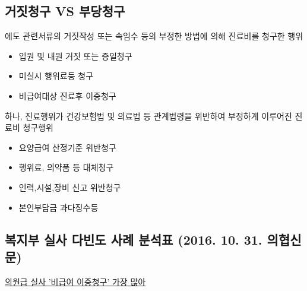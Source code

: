 \subsection{거짓청구 VS 부당청구}
\begin{description}\tightlist
\item[거짓청구] 에도 관련서류의 거짓작성 또는 속임수 등의 부정한 방법에 의해 진료비를 청구한 행위
	\begin{itemize}\tightlist
	\item 입원 및 내원 거짓 또는 증일청구
	\item 미실시 행위료등 청구
	\item 비급여대상 진료후 이중청구
	\end{itemize}
\item[부당청구] 하나, 진료행위가 건강보험법 및 의료법 등 관계법령을 위반하여 부정하게 이루어진 진료비 청구행위
	\begin{itemize}\tightlist
	\item 요양급여 산정기준 위반청구
	\item 행위료, 의약품 등 대체청구
	\item 인력,시설,장비 신고 위반청구
	\item 본인부담금 과다징수등
	\end{itemize}
\end{description}
\subsection{복지부 실사 다빈도 사례 분석표 (2016. 10. 31. 의협신문)} 
\href{http://www.doctorsnews.co.kr/news/articleView.html?idxno=113498}{의원급 실사 '비급여 이중청구' 가장 많아}
\par
\medskip

